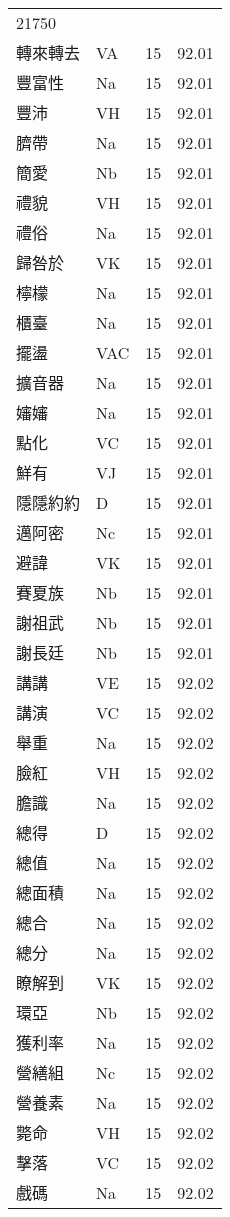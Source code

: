 \documentclass[twocolumn]{book}
\begin{document}
\begin{supertabular}{llrr}
21750\\
轉來轉去 & VA & 15 &  92.01\\
豐富性 & Na & 15 &  92.01\\
豐沛 & VH & 15 &  92.01\\
臍帶 & Na & 15 &  92.01\\
簡愛 & Nb & 15 &  92.01\\
禮貌 & VH & 15 &  92.01\\
禮俗 & Na & 15 &  92.01\\
歸咎於 & VK & 15 &  92.01\\
檸檬 & Na & 15 &  92.01\\
櫃臺 & Na & 15 &  92.01\\
擺盪 & VAC & 15 &  92.01\\
擴音器 & Na & 15 &  92.01\\
嬸嬸 & Na & 15 &  92.01\\
點化 & VC & 15 &  92.01\\
鮮有 & VJ & 15 &  92.01\\
隱隱約約 & D & 15 &  92.01\\
邁阿密 & Nc & 15 &  92.01\\
避諱 & VK & 15 &  92.01\\
賽夏族 & Nb & 15 &  92.01\\
謝祖武 & Nb & 15 &  92.01\\
謝長廷 & Nb & 15 &  92.01\\
講講 & VE & 15 &  92.02\\
講演 & VC & 15 &  92.02\\
舉重 & Na & 15 &  92.02\\
臉紅 & VH & 15 &  92.02\\
膽識 & Na & 15 &  92.02\\
總得 & D & 15 &  92.02\\
總值 & Na & 15 &  92.02\\
總面積 & Na & 15 &  92.02\\
總合 & Na & 15 &  92.02\\
總分 & Na & 15 &  92.02\\
瞭解到 & VK & 15 &  92.02\\
環亞 & Nb & 15 &  92.02\\
獲利率 & Na & 15 &  92.02\\
營繕組 & Nc & 15 &  92.02\\
營養素 & Na & 15 &  92.02\\
斃命 & VH & 15 &  92.02\\
擊落 & VC & 15 &  92.02\\
戲碼 & Na & 15 &  92.02\\

\end{supertabular}
\end{document}
